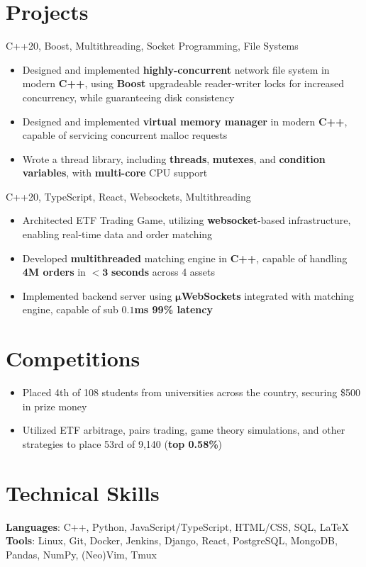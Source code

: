 \documentclass[letterpaper,11pt]{article}
\begin{document}
\section{Projects}
{C++20, Boost, Multithreading, Socket Programming, File Systems}{}
\begin{itemize}
  \item Designed and implemented \textbf{highly-concurrent} network file system in modern
        \textbf{C++}, using \textbf{Boost} upgradeable reader-writer locks for
        increased concurrency, while guaranteeing disk consistency
\end{itemize}
\begin{itemize}
  \item Designed and implemented \textbf{virtual memory manager} in modern
        \textbf{C++}, capable of servicing concurrent malloc requests
  \item Wrote a thread library, including \textbf{threads}, \textbf{mutexes},
        and \textbf{condition variables}, with \textbf{multi-core} CPU support
\end{itemize}
{C++20, TypeScript, React, Websockets, Multithreading}{}
\begin{itemize}
  \item Architected ETF Trading Game, utilizing \textbf{websocket}-based
        infrastructure, enabling real-time data and order matching
  \item Developed \textbf{multithreaded} matching engine in \textbf{C++}, capable of
        handling \textbf{4M orders} in $\mathbf{< 3}$ \textbf{seconds} across 4 assets
  \item Implemented backend server using $\mathbf{\mu}$\textbf{WebSockets}
        integrated with matching engine, capable of sub $\mathbf{0.1}$\textbf{ms 99\% latency}
\end{itemize}

\section{Competitions}
\begin{itemize}
  \item Placed 4th of 108 students from universities across the country, securing \$500 in prize money
\end{itemize}
\begin{itemize}
  \item Utilized ETF arbitrage, pairs trading, game theory simulations, and
        other strategies to place 53rd of 9,140 (\textbf{top 0.58\%})
\end{itemize}
\section{Technical Skills}
\textbf{Languages}: C++, Python, JavaScript/TypeScript, HTML/CSS, SQL, \LaTeX
\\
\textbf{Tools}: Linux, Git, Docker, Jenkins, Django, React, PostgreSQL,
MongoDB, Pandas, NumPy, (Neo)Vim, Tmux
\end{document}
